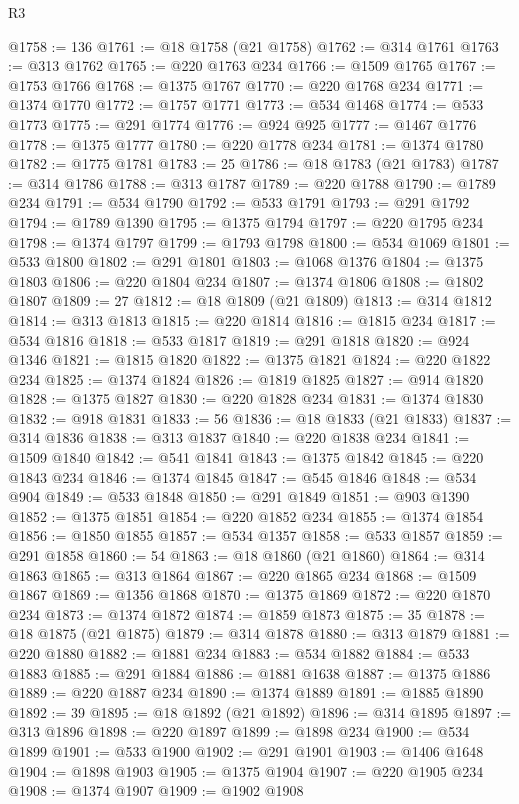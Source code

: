 \begin{lexlean}{R3}
\begin{coremodule}
@1758 := 136
@1761 := @18 @1758 (@21 @1758)
@1762 := @314 @1761
@1763 := @313 @1762
@1765 := @220 @1763 @234
@1766 := @1509 @1765
@1767 := @1753 @1766
@1768 := @1375 @1767
@1770 := @220 @1768 @234
@1771 := @1374 @1770
@1772 := @1757 @1771
@1773 := @534 @1468
@1774 := @533 @1773
@1775 := @291 @1774
@1776 := @924 @925
@1777 := @1467 @1776
@1778 := @1375 @1777
@1780 := @220 @1778 @234
@1781 := @1374 @1780
@1782 := @1775 @1781
@1783 := 25
@1786 := @18 @1783 (@21 @1783)
@1787 := @314 @1786
@1788 := @313 @1787
@1789 := @220 @1788
@1790 := @1789 @234
@1791 := @534 @1790
@1792 := @533 @1791
@1793 := @291 @1792
@1794 := @1789 @1390
@1795 := @1375 @1794
@1797 := @220 @1795 @234
@1798 := @1374 @1797
@1799 := @1793 @1798
@1800 := @534 @1069
@1801 := @533 @1800
@1802 := @291 @1801
@1803 := @1068 @1376
@1804 := @1375 @1803
@1806 := @220 @1804 @234
@1807 := @1374 @1806
@1808 := @1802 @1807
@1809 := 27
@1812 := @18 @1809 (@21 @1809)
@1813 := @314 @1812
@1814 := @313 @1813
@1815 := @220 @1814
@1816 := @1815 @234
@1817 := @534 @1816
@1818 := @533 @1817
@1819 := @291 @1818
@1820 := @924 @1346
@1821 := @1815 @1820
@1822 := @1375 @1821
@1824 := @220 @1822 @234
@1825 := @1374 @1824
@1826 := @1819 @1825
@1827 := @914 @1820
@1828 := @1375 @1827
@1830 := @220 @1828 @234
@1831 := @1374 @1830
@1832 := @918 @1831
@1833 := 56
@1836 := @18 @1833 (@21 @1833)
@1837 := @314 @1836
@1838 := @313 @1837
@1840 := @220 @1838 @234
@1841 := @1509 @1840
@1842 := @541 @1841
@1843 := @1375 @1842
@1845 := @220 @1843 @234
@1846 := @1374 @1845
@1847 := @545 @1846
@1848 := @534 @904
@1849 := @533 @1848
@1850 := @291 @1849
@1851 := @903 @1390
@1852 := @1375 @1851
@1854 := @220 @1852 @234
@1855 := @1374 @1854
@1856 := @1850 @1855
@1857 := @534 @1357
@1858 := @533 @1857
@1859 := @291 @1858
@1860 := 54
@1863 := @18 @1860 (@21 @1860)
@1864 := @314 @1863
@1865 := @313 @1864
@1867 := @220 @1865 @234
@1868 := @1509 @1867
@1869 := @1356 @1868
@1870 := @1375 @1869
@1872 := @220 @1870 @234
@1873 := @1374 @1872
@1874 := @1859 @1873
@1875 := 35
@1878 := @18 @1875 (@21 @1875)
@1879 := @314 @1878
@1880 := @313 @1879
@1881 := @220 @1880
@1882 := @1881 @234
@1883 := @534 @1882
@1884 := @533 @1883
@1885 := @291 @1884
@1886 := @1881 @1638
@1887 := @1375 @1886
@1889 := @220 @1887 @234
@1890 := @1374 @1889
@1891 := @1885 @1890
@1892 := 39
@1895 := @18 @1892 (@21 @1892)
@1896 := @314 @1895
@1897 := @313 @1896
@1898 := @220 @1897
@1899 := @1898 @234
@1900 := @534 @1899
@1901 := @533 @1900
@1902 := @291 @1901
@1903 := @1406 @1648
@1904 := @1898 @1903
@1905 := @1375 @1904
@1907 := @220 @1905 @234
@1908 := @1374 @1907
@1909 := @1902 @1908

\end{coremodule}
\end{lexlean}
